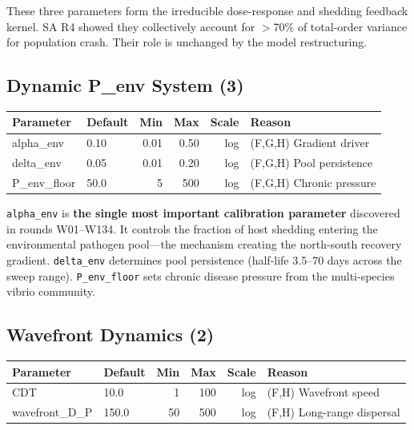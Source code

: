 \documentclass[11pt,a4paper]{article}
\begin{document}
\noindent These three parameters form the irreducible dose-response and shedding feedback kernel. SA R4 showed they collectively account for $>$70\% of total-order variance for population crash. Their role is unchanged by the model restructuring.

\subsection{Dynamic P\_env System (3)}

\begin{table}[H]
\centering
\begin{tabular}{llrrrl}
\toprule
\textbf{Parameter} & \textbf{Default} & \textbf{Min} & \textbf{Max} & \textbf{Scale} & \textbf{Reason} \\
\midrule
\textcolor{newparam}{alpha\_env} & 0.10 & 0.01 & 0.50 & log & (F,G,H) Gradient driver \\
\textcolor{newparam}{delta\_env} & 0.05 & 0.01 & 0.20 & log & (F,G,H) Pool persistence \\
\textcolor{newparam}{P\_env\_floor} & 50.0 & 5 & 500 & log & (F,G,H) Chronic pressure \\
\bottomrule
\end{tabular}
\end{table}

\noindent \texttt{alpha\_env} is \textbf{the single most important calibration parameter} discovered in rounds W01--W134. It controls the fraction of host shedding entering the environmental pathogen pool---the mechanism creating the north-south recovery gradient. \texttt{delta\_env} determines pool persistence (half-life 3.5--70 days across the sweep range). \texttt{P\_env\_floor} sets chronic disease pressure from the multi-species vibrio community.

\subsection{Wavefront Dynamics (2)}

\begin{table}[H]
\centering
\begin{tabular}{llrrrl}
\toprule
\textbf{Parameter} & \textbf{Default} & \textbf{Min} & \textbf{Max} & \textbf{Scale} & \textbf{Reason} \\
\midrule
\textcolor{newparam}{CDT} & 10.0 & 1 & 100 & log & (F,H) Wavefront speed \\
\textcolor{newparam}{wavefront\_D\_P} & 150.0 & 50 & 500 & log & (F,H) Long-range dispersal \\
\bottomrule
\end{tabular}
\end{table}
\end{document}
